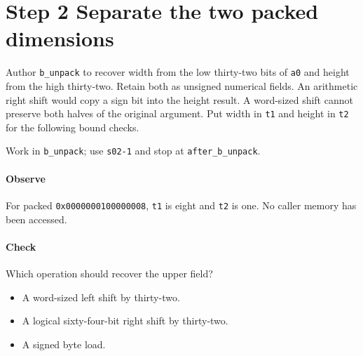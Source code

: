 \section{Step 2 Separate the two packed dimensions}\label{qoi-s02}
Author \texttt{b\_unpack} to recover width from the low thirty-two bits of \texttt{a0} and height from the high thirty-two. Retain both as unsigned numerical fields. An arithmetic right shift would copy a sign bit into the height result. A word-sized shift cannot preserve both halves of the original argument. Put width in \texttt{t1} and height in \texttt{t2} for the following bound checks.

Work in \texttt{b\_unpack}; use \texttt{s02-1} and stop at \texttt{after\_b\_unpack}.

\paragraph{Observe} For packed \texttt{0x0000000100000008}, \texttt{t1} is eight and \texttt{t2} is one. No caller memory has been accessed.

\paragraph{Check} Which operation should recover the upper field?
\begin{itemize}
\item[A.] A word-sized left shift by thirty-two.
\item[B.] A logical sixty-four-bit right shift by thirty-two.
\item[C.] A signed byte load.
\end{itemize}
